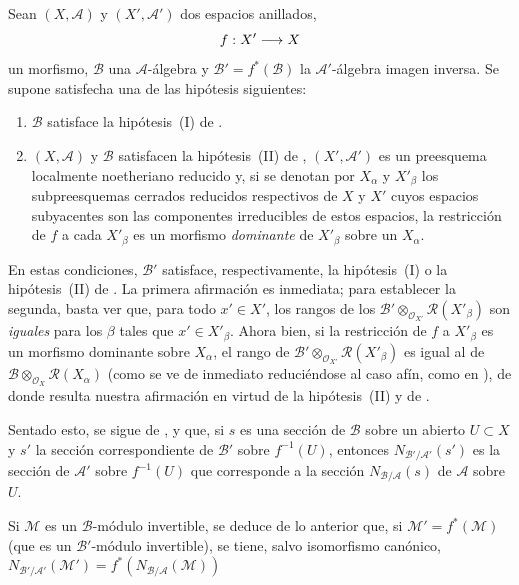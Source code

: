 \documentclass[oneside,10pt]{amsart}
\makeatletter
\newcommand{\ega@arrow}[2]{\mathchoice{#1}{#2}{#2}{#2}}
\renewcommand{\to}{\ega@arrow{\longrightarrow}{\rightarrow}}
\newcommand{\oldpage}[2][]{\marginnote{\normalfont\footnotesize\textbf{#1}~|~#2}\ignorespaces}
\let\EGAOriginalLabel\label
\renewcommand{\label}[1]{\phantomsection\EGAOriginalLabel{#1}}
\makeatother
\begin{document}
\begin{env}[6.5.4]
\label{II.6.5.4-fr}
Sean $(X,\mathcal{A})$ y $(X',\mathcal{A}')$ dos espacios anillados, \[
f:X'\to X
\] un morfismo, $\mathcal{B}$ una $\mathcal{A}$-álgebra y $\mathcal{B}'=f^*(\mathcal{B})$ la $\mathcal{A}'$-álgebra imagen inversa.
Se supone satisfecha una de las hipótesis siguientes:
\begin{enumerate}
  \item[$1^\circ$] $\mathcal{B}$ satisface la hipótesis~(I) de .
  \item[$2^\circ$] $(X,\mathcal{A})$ y $\mathcal{B}$ satisfacen la hipótesis~(II) de , $(X',\mathcal{A}')$ es un preesquema localmente noetheriano reducido y, si se denotan por $X_\alpha$ y $X'_\beta$ los subpreesquemas cerrados reducidos respectivos de $X$ y $X'$ cuyos espacios subyacentes son las componentes irreducibles de estos espacios, la restricción de $f$ a cada $X'_\beta$ es un morfismo \emph{dominante} de $X'_\beta$ sobre un $X_\alpha$.
\end{enumerate}

En estas condiciones, $\mathcal{B}'$ satisface, respectivamente, la hipótesis~(I) o la hipótesis~(II) de .
La primera afirmación es inmediata;
para establecer la segunda, basta ver que, para todo $x'\in X'$, los rangos de los $\mathcal{B}'\otimes_{\mathcal{O}_{X'}}\mathcal{R}(X'_\beta)$ son \emph{iguales} para los $\beta$ tales que $x'\in X'_\beta$.
Ahora bien, si la restricción de $f$ a $X'_\beta$ es un morfismo dominante sobre $X_\alpha$, el rango de $\mathcal{B}'\otimes_{\mathcal{O}_{X'}}\mathcal{R}(X'_\beta)$ es igual al de $\mathcal{B}\otimes_{\mathcal{O}_X}\mathcal{R}(X_\alpha)$ (como se ve de inmediato reduciéndose al caso afín, como en ), de donde resulta nuestra afirmación en virtud de la hipótesis~(II) y de .

\oldpage[II]{129}
Sentado esto, se sigue de ,  y  que, si $s$ es una sección de $\mathcal{B}$ sobre un abierto $U\subset X$ y $s'$ la sección correspondiente de $\mathcal{B}'$ sobre $f^{-1}(U)$, entonces $N_{\mathcal{B}'/\mathcal{A}'}(s')$ es la sección de $\mathcal{A}'$ sobre $f^{-1}(U)$ que corresponde a la sección $N_{\mathcal{B}/\mathcal{A}}(s)$ de $\mathcal{A}$ sobre $U$.

Si $\mathcal{M}$ es un $\mathcal{B}$-módulo invertible, se deduce de lo anterior que, si $\mathcal{M}'=f^*(\mathcal{M})$ (que es un $\mathcal{B}'$-módulo invertible), se tiene, salvo isomorfismo canónico,
$N_{\mathcal{B}'/\mathcal{A}'}(\mathcal{M}')
=f^*(N_{\mathcal{B}/\mathcal{A}}(\mathcal{M}))$
\end{env}
\end{document}
